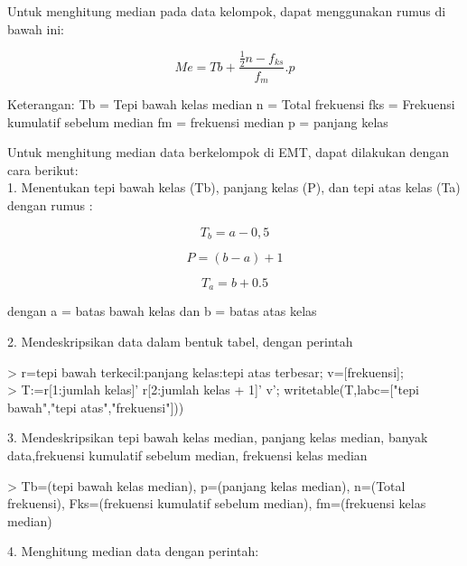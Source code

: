 \documentclass[a4paper,10pt]{article}
\begin{document}
\begin{eulernotebook}
\begin{eulercomment}
\end{eulercomment}
\begin{eulercomment}
Untuk menghitung median pada data kelompok, dapat menggunakan rumus di
bawah ini:\\
\end{eulercomment}
\begin{eulerformula}
\[
Me = Tb+\frac{\frac {1}{2}{n}-f_{ks}}{f_m}.{p}
\]
\end{eulerformula}
\begin{eulerttcomment}
   Keterangan:
      Tb = Tepi bawah kelas median
       n = Total frekuensi
     fks = Frekuensi kumulatif sebelum median
      fm = frekuensi median
       p = panjang kelas
\end{eulerttcomment}
\begin{eulercomment}
Untuk menghitung median data berkelompok di EMT, dapat dilakukan
dengan cara berikut:\\
1. Menentukan tepi bawah kelas (Tb), panjang kelas (P), dan tepi atas
kelas (Ta) dengan rumus :

\end{eulercomment}
\begin{eulerformula}
\[
T_b=a-0,5
\]
\end{eulerformula}
\begin{eulerformula}
\[
P=(b-a)+1
\]
\end{eulerformula}
\begin{eulerformula}
\[
T_a=b+0.5
\]
\end{eulerformula}
\begin{eulercomment}
dengan a = batas bawah kelas dan b = batas atas kelas

2. Mendeskripsikan data dalam bentuk tabel, dengan perintah

\textgreater{} r=tepi bawah terkecil:panjang kelas:tepi atas terbesar;
v=[frekuensi];\\
\textgreater{} T:=r[1:jumlah kelas]' \textbar{} r[2:jumlah kelas + 1]' \textbar{} v';
writetable(T,labc=["tepi bawah","tepi atas","frekuensi"]))

3. Mendeskripsikan tepi bawah kelas median, panjang kelas median,
banyak data,frekuensi kumulatif sebelum median, frekuensi kelas median

\textgreater{} Tb=(tepi bawah kelas median), p=(panjang kelas median), n=(Total
frekuensi), Fks=(frekuensi kumulatif sebelum median), fm=(frekuensi
kelas median)

4. Menghitung median data dengan perintah:


\end{eulercomment}
\end{eulernotebook}
\end{document}
